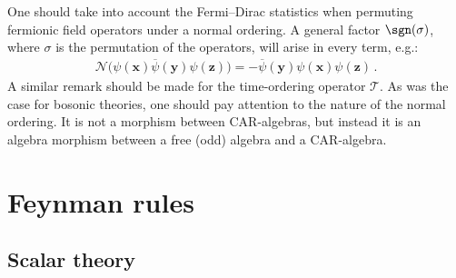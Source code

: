 
    \begin{remark}
        One should take into account the Fermi--Dirac statistics when permuting fermionic field operators under a normal ordering. A general factor $\sgn(\sigma)$, where $\sigma$ is the permutation of the operators, will arise in every term, e.g.:
        \begin{gather}
            \mathcal{N}\bigl(\psi(\mathbf{x})\overline\psi(\mathbf{y})\psi(\mathbf{z})\bigr) = -\overline\psi(\mathbf{y})\psi(\mathbf{x})\psi(\mathbf{z})\,.
        \end{gather}
        A similar remark should be made for the time-ordering operator $\mathcal{T}$. As was the case for bosonic theories, one should pay attention to the nature of the normal ordering. It is not a morphism between CAR-algebras, but instead it is an algebra morphism between a free (odd) algebra and a CAR-algebra.
    \end{remark}

\section{Feynman rules}
\subsection{Scalar theory}

